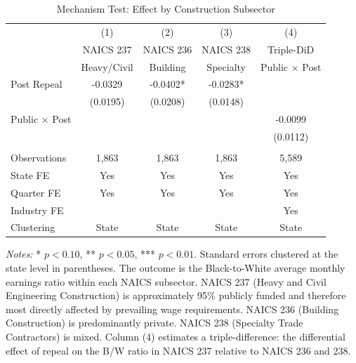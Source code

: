 \begin{table}[H]
\centering
\caption{Mechanism Test: Effect by Construction Subsector}
\label{tab:mechanism}
\begin{threeparttable}
\begin{tabular}{lcccc}
\toprule
 & (1) & (2) & (3) & (4) \\
 & NAICS 237 & NAICS 236 & NAICS 238 & Triple-DiD \\
 & Heavy/Civil & Building & Specialty & Public $\times$ Post \\
\midrule
Post Repeal & -0.0329 & -0.0402* & -0.0283* & \\
 & (0.0195) & (0.0208) & (0.0148) & \\
Public $\times$ Post & & & & -0.0099 \\
 & & & & (0.0112) \\
\\
Observations & 1,863 & 1,863 & 1,863 & 5,589 \\
State FE & Yes & Yes & Yes & Yes \\
Quarter FE & Yes & Yes & Yes & Yes \\
Industry FE & & & & Yes \\
Clustering & State & State & State & State \\
\bottomrule
\end{tabular}
\begin{tablenotes}[flushleft]
\small
\item \textit{Notes:} * $p<0.10$, ** $p<0.05$, *** $p<0.01$. Standard errors clustered at the state level in parentheses. The outcome is the Black-to-White average monthly earnings ratio within each NAICS subsector. NAICS 237 (Heavy and Civil Engineering Construction) is approximately 95\% publicly funded and therefore most directly affected by prevailing wage requirements. NAICS 236 (Building Construction) is predominantly private. NAICS 238 (Specialty Trade Contractors) is mixed. Column (4) estimates a triple-difference: the differential effect of repeal on the B/W ratio in NAICS 237 relative to NAICS 236 and 238.
\end{tablenotes}
\end{threeparttable}
\end{table}
